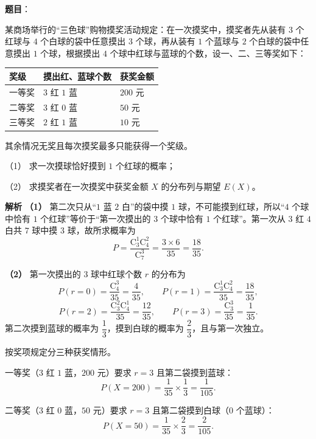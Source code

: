 \begin{answer}

\textbf{题目}：

某商场举行的“三色球”购物摸奖活动规定：在一次摸奖中，摸奖者先从装有 $3$ 个红球与 $4$ 个白球的袋中任意摸出 $3$ 个球，再从装有 $1$ 个蓝球与 $2$ 个白球的袋中任意摸出 $1$ 个球，根据摸出 $4$ 个球中红球与蓝球的个数，设一、二、三等奖如下：

\begin{center}
\begin{tabular}{lll}
\toprule
奖级 & 摸出红、蓝球个数 & 获奖金额 \\
\midrule
一等奖 & $3$ 红 $1$ 蓝 & $200$ 元 \\
二等奖 & $3$ 红 $0$ 蓝 & $50$ 元 \\
三等奖 & $2$ 红 $1$ 蓝 & $10$ 元 \\
\bottomrule
\end{tabular}
\end{center}

其余情况无奖且每次摸奖最多只能获得一个奖级。

（1） 求一次摸球恰好摸到 $1$ 个红球的概率；

（2） 求摸奖者在一次摸奖中获奖金额 $X$ 的分布列与期望 $E(X)$。

\textbf{解析}
\textbf{（1）} 第二次只从“$1$ 蓝 $2$ 白”的袋中摸 $1$ 球，不可能摸到红球，所以“$4$ 个球中恰有 $1$ 个红球”等价于“第一次摸出的 $3$ 个球中恰有 $1$ 个红球”。第一次从 $3$ 红 $4$ 白共 $7$ 球中摸 $3$ 球，故所求概率为
\nopagebreak[4]
\[P=\frac{\mathrm C_3^1\mathrm C_4^2}{\mathrm C_7^3}=\frac{3\times6}{35}=\frac{18}{35}.\]

\textbf{（2）} 第一次摸出的 $3$ 球中红球个数 $r$ 的分布为
\nopagebreak[4]
\[P(r=0)=\frac{\mathrm C_4^3}{35}=\frac4{35},\qquad
P(r=1)=\frac{\mathrm C_3^1\mathrm C_4^2}{35}=\frac{18}{35},\]
\nopagebreak[4]
\[P(r=2)=\frac{\mathrm C_3^2\mathrm C_4^1}{35}=\frac{12}{35},\qquad
P(r=3)=\frac{\mathrm C_3^3}{35}=\frac1{35}.\]
第二次摸到蓝球的概率为 $\dfrac13$，摸到白球的概率为 $\dfrac23$，且与第一次独立。

按奖项规定分三种获奖情形。

一等奖（$3$ 红 $1$ 蓝，$200$ 元）要求 $r=3$ 且第二袋摸到蓝球：
\nopagebreak[4]
\[P(X=200)=\frac1{35}\times\frac13=\frac1{105}.\]

二等奖（$3$ 红 $0$ 蓝，$50$ 元）要求 $r=3$ 且第二袋摸到白球（$0$ 个蓝球）：
\nopagebreak[4]
\[P(X=50)=\frac1{35}\times\frac23=\frac2{105}.\]


\end{answer}
